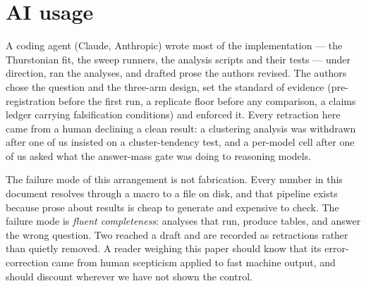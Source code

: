 \documentclass[11pt,a4paper]{article}
\begin{document}
\begin{table}[htbp]
\centering
\caption{Table~\ref{tab:main} with full HuggingFace model ids.}
\footnotesize
\setlength{\tabcolsep}{4pt}

\end{table}

\begin{table}[htbp]
\centering
\caption{Self-report under instruction: what models say about a disposition they
were given, against a no-persona baseline.}
\small
\label{tab:stated}

\end{table}

\begin{table}[htbp]
\centering
\caption{The revealed channel: whether a concealment instruction that changes
what a model says also changes what it chooses.}
\small
\label{tab:revealed}

\end{table}

\begin{table}[htbp]
\centering
\caption{The neutral-option control --- what happens to the floor when
``neither'' becomes available. \NeutNModels{} models, \NeutNCells{} cells.}
\small
\label{tab:neutral}

\end{table}

\begin{table}[htbp]
\centering
\caption{Compliance: which models obey a directive to prefer against their own
ordering, and which decline.}
\small
\label{tab:comply}

\end{table}


\section*{AI usage}

A coding agent (Claude, Anthropic) wrote most of the implementation --- the
Thurstonian fit, the sweep runners, the analysis scripts and their tests ---
under direction, ran the analyses, and drafted prose the authors revised. The
authors chose the question and the three-arm design, set the standard of
evidence (pre-registration before the first run, a replicate floor before any
comparison, a claims ledger carrying falsification conditions) and enforced it.
Every retraction here came from a human declining a clean result: a clustering
analysis was withdrawn after one of us insisted on a cluster-tendency test, and
a per-model cell after one of us asked what the answer-mass gate was doing to
reasoning models.

The failure mode of this arrangement is not fabrication. Every number in this
document resolves through a macro to a file on disk, and that pipeline exists
because prose about results is cheap to generate and expensive to check. The
failure mode is \emph{fluent completeness}: analyses that run, produce tables,
and answer the wrong question. Two reached a draft and are recorded as
retractions rather than quietly removed. A reader weighing this paper should
know that its error-correction came from human scepticism applied to fast
machine output, and should discount wherever we have not shown the control.
\end{document}

